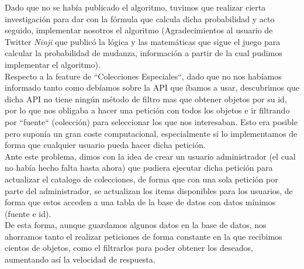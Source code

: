 Dado que no se había publicado el algoritmo, tuvimos que realizar cierta investigación para dar con la fórmula que calcula dicha probabilidad y acto seguido, implementar nosotros el algoritmo (Agradecimientos al usuario de Twitter \textit{Ninji} que publicó la lógica y las matemáticas que sigue el juego para calcular la probabilidad de mudanza, información a partir de la cual pudimos implementar el algoritmo).\\

Respecto a la feature de ``Colecciones Especiales``, dado que no nos habíamos informado tanto como debíamos sobre la API que íbamos a usar, descubrimos que dicha API no tiene ningún método de filtro mas que obtener objetos por su id, por lo que nos obligaba a hacer una petición con todos los objetos e ir filtrando por ``fuente`` (colección) para seleccionar los que nos interesaban. Esto era posible pero suponía un gran coste computacional, especialmente si lo implementamos de forma que cualquier usuario pueda hacer dicha petición.\\

Ante este problema, dimos con la idea de crear un usuario administrador (el cual no había hecho falta hasta ahora) que pudiera ejecutar dicha petición para actualizar el catalogo de colecciones, de forma que con una sola petición por parte del administrador, se actualizan los items disponibles para los usuarios, de forma que estos acceden a una tabla de la base de datos con datos mínimos (fuente e id).\\

De esta forma, aunque guardamos algunos datos en la base de datos, nos ahorramos tanto el realizar peticiones de forma constante en la que recibimos cientos de objetos, como el filtrarlos para poder obtener los deseados, aumentando así la velocidad de respuesta.\\






	